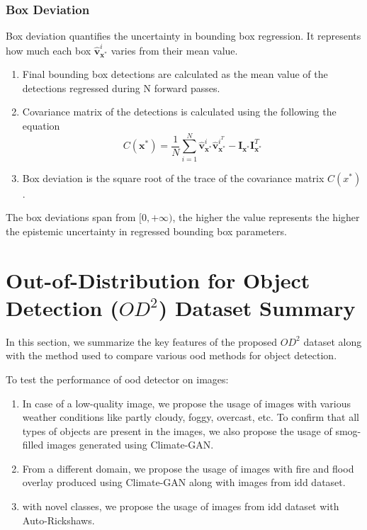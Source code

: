     \subsubsection{Box Deviation}
    \label{bdev_calc}
    Box deviation quantifies the uncertainty in bounding box regression. It represents how much each box $\hat{\mathbf{v}}_{\mathbf{x}^{*}}^{i}$ varies from their mean value. 
    
    \begin{enumerate}
        \item Final bounding box detections are calculated as the mean value of the detections regressed during N forward passes.
        \item Covariance matrix of the detections is calculated using the following the equation
            \begin{equation}
                C\left(\mathbf{x}^{*}\right)=\frac{1}{N} \sum_{i=1}^{N} \hat{\mathbf{v}}_{\mathbf{x}^{*}}^{i} \hat{\mathbf{v}}_{\mathbf{x}^{*}}^{i^{T}}-\mathbf{I}_{\mathbf{x}^{*}} \mathbf{I}_{\mathbf{x}^{*}}^{T}
            \end{equation}
        \item Box deviation is the square root of the trace of the covariance matrix $C(x^{*})$.
    \end{enumerate}
         
    The box deviations span from $[0,+\infty)$, the higher the value represents the higher the epistemic uncertainty in regressed bounding box parameters.
    
    \section{Out-of-Distribution for Object Detection ($OD^{2}$) Dataset Summary}
    In this section, we summarize the key features of the proposed $OD^{2}$ dataset along with the method used to compare various \acrshort{ood} methods for object detection.
    
    To test the performance of \acrshort{ood} detector on images:
    \begin{enumerate}
        \item In case of a low-quality image, we propose the usage of images with various weather conditions like partly cloudy, foggy, overcast, etc. To confirm that all types of objects are present in the images, we also propose the usage of smog-filled images generated using Climate-GAN. 
        \item From a different domain, we propose the usage of images with fire and flood overlay produced using Climate-GAN along with images from \acrshort{idd} dataset.
        \item with novel classes, we propose the usage of images from \acrshort{idd} dataset with Auto-Rickshaws.
    \end{enumerate}
    
